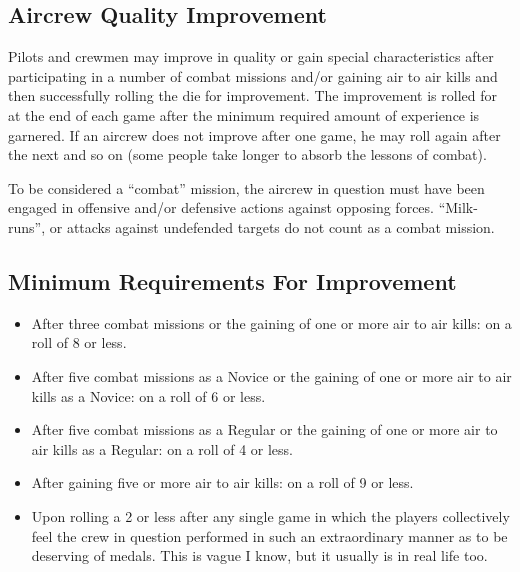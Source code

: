 \begin{advancedrules}
    \subsection{Aircrew Quality Improvement} Pilots and crewmen may improve in quality or gain special characteristics after participating in a number of combat missions and/or gaining air to air kills and then successfully rolling the die for improvement. The improvement is rolled for at the end of each game after the minimum required amount of experience is garnered. If an aircrew does not improve after one game, he may roll again after the next and so on (some people take longer to absorb the lessons of combat).

    To be considered a “combat” mission, the aircrew in question must have been engaged in offensive and/or defensive actions against opposing forces. “Milk-runs”, or attacks against undefended targets do not count as a combat mission.

    \subsection{Minimum Requirements For Improvement}

    \begin{itemize}

        \item {} After three combat missions or the gaining of one or more air to air kills: on a roll of 8 or less.

        \item {} After five combat missions as a Novice or the gaining of one or more air to air kills as a Novice: on a roll of 6 or less.

        \item {} After five combat missions as a Regular or the gaining of one or more air to air kills as a Regular: on a roll of 4 or less.

        \item {} After gaining five or more air to air kills: on a roll of 9 or less.

        \item {} Upon rolling a 2 or less after any single game in which the players collectively feel the crew in question performed in such an extraordinary manner as to be deserving of medals. This is vague I know, but it usually is in real life too.


\end{itemize}
\end{advancedrules}
